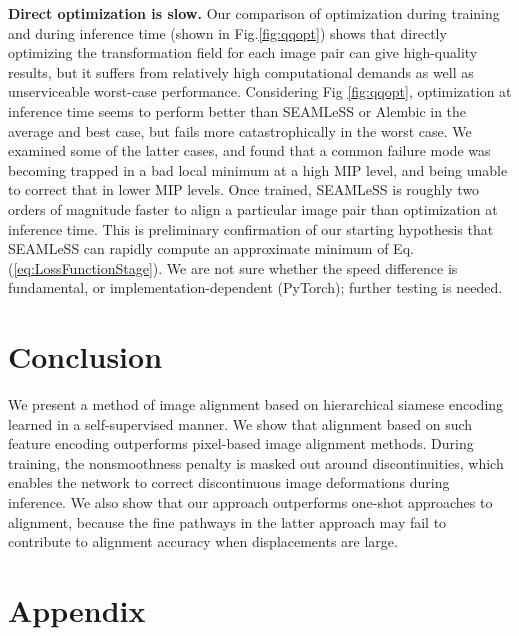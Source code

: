 \documentclass{article}
\begin{document}
\textbf {Direct optimization is slow. } Our comparison of optimization during training and during inference time (shown in Fig.\ref{fig:qqopt}) shows that directly optimizing the transformation field for each image pair can give high-quality results, but it suffers from relatively high computational demands as well as unserviceable worst-case performance. Considering Fig \ref{fig:qqopt}, optimization at inference time seems to perform better than SEAMLeSS or Alembic in the average and best case, but fails more catastrophically in the worst case. We examined some of the latter cases, and found that a common failure mode was becoming trapped in a bad local minimum at a high MIP level, and being unable to correct that in lower MIP levels. Once trained, SEAMLeSS is roughly two orders of magnitude faster to align a particular image pair than optimization at inference time. This is preliminary confirmation of our starting hypothesis that SEAMLeSS can rapidly compute an approximate minimum of Eq. (\ref{eq:LossFunctionStage}). We are not sure whether the speed difference is fundamental, or implementation-dependent (PyTorch); further testing is needed.

\section{Conclusion}
We present a method of image alignment based on hierarchical siamese encoding learned in a self-supervised manner. We show that alignment based on such feature encoding outperforms pixel-based image alignment methods. During training, the nonsmoothness penalty is masked out around discontinuities, which enables the network to correct discontinuous image deformations during inference.  We also show that our approach outperforms one-shot approaches to alignment, because the fine pathways in the latter approach may fail to contribute to alignment accuracy when displacements are large.





{\footnotesize}
\newpage

\appendix
\section{Appendix}
\end{document}
